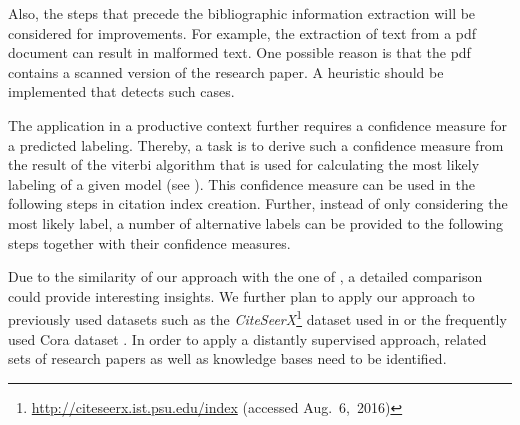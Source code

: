 Also, the steps that precede the bibliographic information extraction will be considered for improvements.
For example, the extraction of text from a \gls{pdf} document can result in malformed text.
One possible reason is that the \gls{pdf} contains a scanned version of the research paper.
A heuristic should be implemented that detects such cases.

The application in a productive context further requires a confidence measure for a predicted labeling.
Thereby, a task is to derive such a confidence measure from the result of the \gls{viterbi algorithm} that is used for calculating the most likely labeling of a given model (see ).
This confidence measure can be used in the following steps in citation index creation.
Further, instead of only considering the most likely label, a number of alternative labels can be provided to the following steps together with their confidence measures.

\bigskip

Due to the similarity of our approach with the one of \citet{lu2013web}, a detailed comparison could provide interesting insights.
We further plan to apply our approach to previously used datasets such as the \textit{CiteSeerX}\footnote{\url{http://citeseerx.ist.psu.edu/index} (accessed Aug.~6,~2016)} dataset used in \citet{councill2008parscit} or the frequently used Cora dataset \citep[e.g.][]{peng2004accurate,councill2008parscit,wu2014citeseerx}.
In order to apply a distantly supervised approach, related sets of research papers as well as knowledge bases need to be identified.

